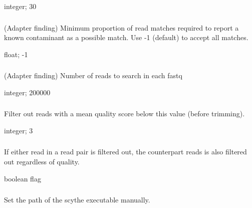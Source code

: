 \documentclass[letterpaper,11pt,english]{sphinxmanual}
\begin{document}
 integer;  30


\subsubsection{}
\label{\detokenize{prog_desc:m-adapter-known-min-match}}
 (Adapter finding) Minimum proportion of read matches required to report a known contaminant as a possible match. Use -1 (default) to accept all matches.

 float;  -1


\subsubsection{}
\label{\detokenize{prog_desc:n-adapter-number-of-reads}}
 (Adapter finding) Number of reads to search in each fastq

 integer;  200000


\subsubsection{}
\label{\detokenize{prog_desc:q-filter-quality}}
 Filter out reads with a mean quality score below this value (before trimming).

 integer;  3


\subsubsection{}
\label{\detokenize{prog_desc:u-filter-unpaired}}
 If either read in a read pair is filtered out, the counterpart reads is also filtered out regardless of quality.

 boolean flag


\subsubsection{}
\label{\detokenize{prog_desc:x-scythe-executable}}
 Set the path of the scythe executable manually.
\end{document}
